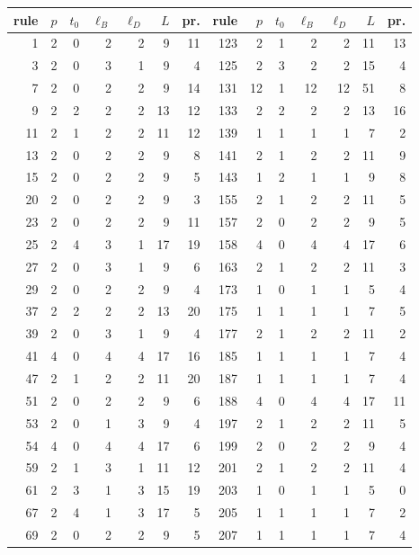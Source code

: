 \documentclass[11pt]{article}
\theoremstyle{definition}
\theoremstyle{remark}
\begin{document}
\begin{table}[ht]\centering\footnotesize\setlength{\tabcolsep}{4pt}
\begin{tabular}{rrrrrrr|rrrrrrr}\toprule
rule & $p$ & $t_0$ & $\ell_B$ & $\ell_D$ & $L$ & pr. & rule & $p$ & $t_0$ & $\ell_B$ & $\ell_D$ & $L$ & pr.\\\midrule
1 & 2 & 0 & 2 & 2 & 9 & 11 & 123 & 2 & 1 & 2 & 2 & 11 & 13 \\
3 & 2 & 0 & 3 & 1 & 9 & 4 & 125 & 2 & 3 & 2 & 2 & 15 & 4 \\
7 & 2 & 0 & 2 & 2 & 9 & 14 & 131 & 12 & 1 & 12 & 12 & 51 & 8 \\
9 & 2 & 2 & 2 & 2 & 13 & 12 & 133 & 2 & 2 & 2 & 2 & 13 & 16 \\
11 & 2 & 1 & 2 & 2 & 11 & 12 & 139 & 1 & 1 & 1 & 1 & 7 & 2 \\
13 & 2 & 0 & 2 & 2 & 9 & 8 & 141 & 2 & 1 & 2 & 2 & 11 & 9 \\
15 & 2 & 0 & 2 & 2 & 9 & 5 & 143 & 1 & 2 & 1 & 1 & 9 & 8 \\
20 & 2 & 0 & 2 & 2 & 9 & 3 & 155 & 2 & 1 & 2 & 2 & 11 & 5 \\
23 & 2 & 0 & 2 & 2 & 9 & 11 & 157 & 2 & 0 & 2 & 2 & 9 & 5 \\
25 & 2 & 4 & 3 & 1 & 17 & 19 & 158 & 4 & 0 & 4 & 4 & 17 & 6 \\
27 & 2 & 0 & 3 & 1 & 9 & 6 & 163 & 2 & 1 & 2 & 2 & 11 & 3 \\
29 & 2 & 0 & 2 & 2 & 9 & 4 & 173 & 1 & 0 & 1 & 1 & 5 & 4 \\
37 & 2 & 2 & 2 & 2 & 13 & 20 & 175 & 1 & 1 & 1 & 1 & 7 & 5 \\
39 & 2 & 0 & 3 & 1 & 9 & 4 & 177 & 2 & 1 & 2 & 2 & 11 & 2 \\
41 & 4 & 0 & 4 & 4 & 17 & 16 & 185 & 1 & 1 & 1 & 1 & 7 & 4 \\
47 & 2 & 1 & 2 & 2 & 11 & 20 & 187 & 1 & 1 & 1 & 1 & 7 & 4 \\
51 & 2 & 0 & 2 & 2 & 9 & 6 & 188 & 4 & 0 & 4 & 4 & 17 & 11 \\
53 & 2 & 0 & 1 & 3 & 9 & 4 & 197 & 2 & 1 & 2 & 2 & 11 & 5 \\
54 & 4 & 0 & 4 & 4 & 17 & 6 & 199 & 2 & 0 & 2 & 2 & 9 & 4 \\
59 & 2 & 1 & 3 & 1 & 11 & 12 & 201 & 2 & 1 & 2 & 2 & 11 & 4 \\
61 & 2 & 3 & 1 & 3 & 15 & 19 & 203 & 1 & 0 & 1 & 1 & 5 & 0 \\
67 & 2 & 4 & 1 & 3 & 17 & 5 & 205 & 1 & 1 & 1 & 1 & 7 & 2 \\
69 & 2 & 0 & 2 & 2 & 9 & 5 & 207 & 1 & 1 & 1 & 1 & 7 & 4 \\

\end{tabular}
\end{table}
\end{document}
